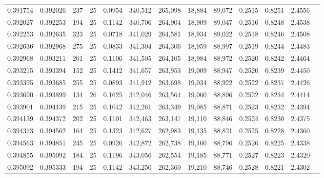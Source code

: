 \begin{tabular}{rrrrrrrrrrrrr}
0.391754 & 0.392026 &   237 &  25 &                                     0.0954 & 340,512 & 265,098 &  18,884 &  89,072 & 0.2515 & 0.8251 & 2.4556 \\
0.392027 & 0.392253 &   194 &  25 &                                     0.1142 & 340,706 & 264,904 &  18,909 &  89,047 & 0.2516 & 0.8248 & 2.4538 \\
0.392253 & 0.392635 &   323 &  25 &                                     0.0718 & 341,029 & 264,581 &  18,934 &  89,022 & 0.2518 & 0.8246 & 2.4508 \\
0.392636 & 0.392968 &   275 &  25 &                                     0.0833 & 341,304 & 264,306 &  18,959 &  88,997 & 0.2519 & 0.8244 & 2.4483 \\
0.392968 & 0.393211 &   201 &  25 &                                     0.1106 & 341,505 & 264,105 &  18,984 &  88,972 & 0.2520 & 0.8242 & 2.4464 \\
0.393215 & 0.393394 &   152 &  25 &                                     0.1412 & 341,657 & 263,953 &  19,009 &  88,947 & 0.2520 & 0.8239 & 2.4450 \\
0.393395 & 0.393685 &   255 &  25 &                                     0.0893 & 341,912 & 263,698 &  19,034 &  88,922 & 0.2522 & 0.8237 & 2.4426 \\
0.393690 & 0.393899 &   134 &  26 &                                     0.1625 & 342,046 & 263,564 &  19,060 &  88,896 & 0.2522 & 0.8234 & 2.4414 \\
0.393901 & 0.394139 &   215 &  25 &                                     0.1042 & 342,261 & 263,349 &  19,085 &  88,871 & 0.2523 & 0.8232 & 2.4394 \\
0.394139 & 0.394372 &   202 &  25 &                                     0.1101 & 342,463 & 263,147 &  19,110 &  88,846 & 0.2524 & 0.8230 & 2.4375 \\
0.394373 & 0.394562 &   164 &  25 &                                     0.1323 & 342,627 & 262,983 &  19,135 &  88,821 & 0.2525 & 0.8228 & 2.4360 \\
0.394563 & 0.394851 &   245 &  25 &                                     0.0926 & 342,872 & 262,738 &  19,160 &  88,796 & 0.2526 & 0.8225 & 2.4338 \\
0.394855 & 0.395092 &   184 &  25 &                                     0.1196 & 343,056 & 262,554 &  19,185 &  88,771 & 0.2527 & 0.8223 & 2.4320 \\
0.395092 & 0.395333 &   194 &  25 &                                     0.1142 & 343,250 & 262,360 &  19,210 &  88,746 & 0.2528 & 0.8221 & 2.4302 \\

\end{tabular}
